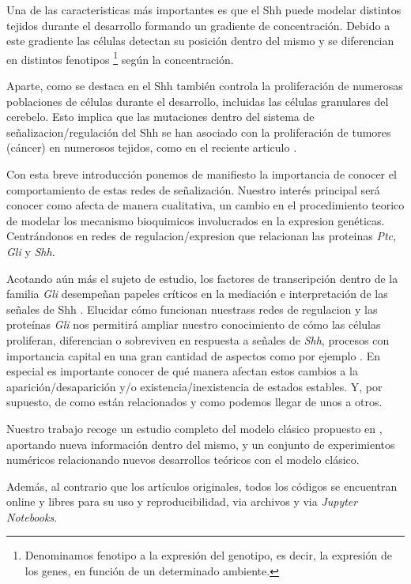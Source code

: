 Una de las caracteristicas más importantes es que el Shh puede modelar distintos tejidos durante el desarrollo formando un gradiente de concentración. Debido a este gradiente las células detectan su posición dentro del mismo y se diferencian en distintos fenotipos \footnote{Denominamos fenotipo a la expresión del genotipo, es decir, la expresión de los genes, en función de un determinado ambiente.} según la concentración.

Aparte, como se destaca en \cite{schaffer} el Shh también
controla la proliferación de numerosas poblaciones de células durante el desarrollo, incluidas las células granulares del cerebelo. Esto implica que las mutaciones dentro del sistema de señalizacion/regulación del Shh se han asociado con la proliferación de tumores (cáncer) en numerosos tejidos, como en el reciente articulo \cite{clement2007hedgehog}.

Con esta breve introducción ponemos de manifiesto la importancia de conocer el comportamiento de estas redes de señalización. Nuestro interés principal será conocer como afecta de manera cualitativa, un cambio en el procedimiento teorico de modelar los mecanismo bioquimicos involucrados en la expresion genéticas. Centrándonos en redes de regulacion/expresion que relacionan las proteinas\textit{ Ptc, Gli} y \textit{Shh.}

Acotando aún más el sujeto de estudio, los factores de transcripción dentro de la familia \textit{Gli} desempeñan papeles críticos en la mediación e interpretación de las señales de Shh \cite{i1999proteins}. Elucidar cómo funcionan nuestrass redes de regulacion y las proteínas \textit{Gli} nos permitirá ampliar nuestro conocimiento de cómo las células proliferan, diferencian o sobreviven en respuesta a señales de \textit{Shh}, procesos con importancia capital en una gran cantidad de aspectos como por ejemplo \cite{dahmane1997activation}. En especial es importante conocer de qué manera afectan estos cambios a la aparición/desaparición y/o existencia/inexistencia de estados estables. Y, por supuesto, de como están relacionados y como podemos llegar de unos a otros. 
 
 Nuestro trabajo recoge un estudio completo del modelo clásico propuesto en \cite{schaffer}, aportando nueva información dentro del mismo, y un conjunto de experimientos numéricos relacionando nuevos desarrollos teóricos con el modelo clásico. 
 
 Además, al contrario que los artículos originales, todos los códigos se encuentran online y libres para su uso y reproducibilidad, via archivos y via \textit{Jupyter Notebooks}.
 
